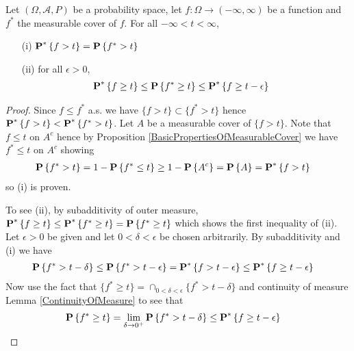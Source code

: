 \begin{prop}\label{OuterTailProbabilities}Let $(\Omega, \mathcal{A}, P)$ be a probability space, let $f : \Omega \to (-\infty, \infty)$ be a function and $f^*$ the measurable cover of $f$. For all $-\infty < t < \infty$, 
\begin{itemize}
\item[(i)] $\textbf{P}^* \left \{f > t \right \} = \textbf{P}\left \{f^* > t \right \}$
\item[(ii)] for all $\epsilon > 0$, 
\begin{align*}
\textbf{P}^* \left \{f \geq t \right \} &\leq \textbf{P}\left \{f^* \geq t \right \} \leq \textbf{P}^* \left \{f \geq t - \epsilon \right \}
\end{align*}
\end{itemize}
\end{prop}
\begin{proof}
Since $f \leq f^*$ a.s. we have $\lbrace f > t \rbrace \subset \lbrace f^* > t \rbrace$ hence $\textbf{P}^* \left \{f > t \right \} < \textbf{P}^* \left \{f^* > t \right \}$.  Let $A$ be a measurable cover of $\lbrace f > t \rbrace$.  Note that $f \leq t$ on $A^c$ hence by Proposition \ref{BasicPropertiesOfMeasurableCover}  we have $f^* \leq t$ on $A^c$ showing
\begin{align*}
\textbf{P}\left \{f^* > t \right \} &= 1 - \textbf{P}\left \{f^* \leq t \right \} \geq 1 - \textbf{P}\left \{A^c \right \} = \textbf{P}\left \{A \right \} = \textbf{P}^* \left \{f > t \right \}
\end{align*}
so (i) is proven.

To see (ii), by subadditivity of outer measure, $\textbf{P}^* \left \{f \geq t \right \} \leq \textbf{P}^* \left \{f^* \geq t \right \}=\textbf{P}\left \{f^* \geq t \right \}$ which shows the first inequality of (ii).   Let $\epsilon > 0$ be given and let $0 < \delta < \epsilon$ be chosen arbitrarily.  By subadditivity and (i) we have
\begin{align*}
\textbf{P}\left \{f^* > t - \delta \right \} &\leq \textbf{P}\left \{f^* > t - \epsilon \right \} = \textbf{P}^* \left \{f > t - \epsilon \right \} \leq \textbf{P}^* \left \{f \geq t - \epsilon \right \}
\end{align*}
Now use the fact that $\lbrace f^* \geq t \rbrace = \cap_{0 < \delta <\epsilon} \lbrace f^* > t - \delta \rbrace$ and continuity of measure Lemma \ref{ContinuityOfMeasure} to see that
\begin{align*}
\textbf{P}\left \{f^* \geq t \right \} &= \lim_{\delta \to 0^+} \textbf{P}\left \{f^* > t - \delta \right \} \leq \textbf{P}^* \left \{f \geq t - \epsilon \right \}
\end{align*}
\end{proof}

